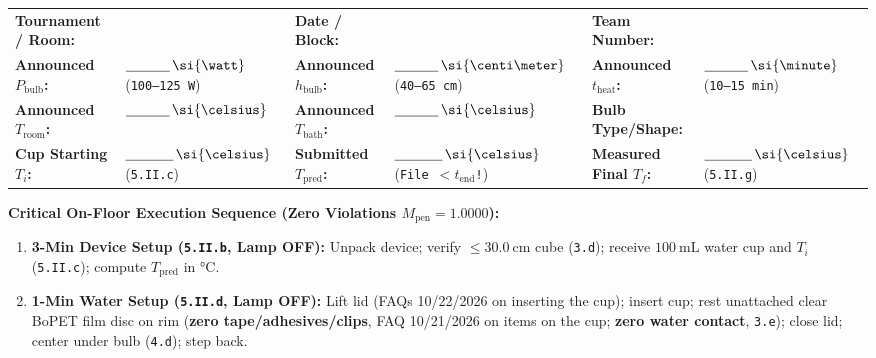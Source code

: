 \begin{devicebox}
\par\smallskip\noindent
{\scriptsize\setlength{\tabcolsep}{3.5pt}\renewcommand{\arraystretch}{1.20}
\begin{tabularx}{\linewidth}{@{}l X l X l X@{}}
\toprule
\textbf{Tournament / Room:} & \dotfill & \textbf{Date / Block:} & \dotfill & \textbf{Team Number:} & \dotfill \\
\textbf{Announced $P_{\mathrm{bulb}}$:} & $\underline{\hspace{1.1cm}}\,\si{\watt}$ (\texttt{100--125 W}) & \textbf{Announced $h_{\mathrm{bulb}}$:} & $\underline{\hspace{1.1cm}}\,\si{\centi\meter}$ (\texttt{40--65 cm}) & \textbf{Announced $t_{\mathrm{heat}}$:} & $\underline{\hspace{1.1cm}}\,\si{\minute}$ (\texttt{10--15 min}) \\
\textbf{Announced $T_{\mathrm{room}}$:} & $\underline{\hspace{1.1cm}}\,\si{\celsius}$ & \textbf{Announced $T_{\mathrm{bath}}$:} & $\underline{\hspace{1.1cm}}\,\si{\celsius}$ & \textbf{Bulb Type/Shape:} & \dotfill \\
\textbf{Cup Starting $T_i$:} & $\mathbf{\underline{\hspace{1.2cm}}\,\si{\celsius}}$ (\texttt{5.II.c}) & \textbf{Submitted $T_{\mathrm{pred}}$:} & $\mathbf{\underline{\hspace{1.2cm}}\,\si{\celsius}}$ (\texttt{File $<t_{\mathrm{end}}$!}) & \textbf{Measured Final $T_f$:} & $\mathbf{\underline{\hspace{1.2cm}}\,\si{\celsius}}$ (\texttt{5.II.g}) \\
\bottomrule
\end{tabularx}}
\par\vspace{2pt}\noindent
{\scriptsize
\textbf{Critical On-Floor Execution Sequence (Zero Violations $M_{\mathrm{pen}} = 1.0000$):}
\begin{enumerate}
  \item \textbf{3-Min Device Setup (\texttt{5.II.b}, Lamp OFF):} Unpack device; verify $\le \SI{30.0}{\centi\meter}$ cube (\texttt{3.d}); receive $\SI{100}{\milli\liter}$ water cup and $T_i$ (\texttt{5.II.c}); compute $T_{\mathrm{pred}}$ in $\si{\celsius}$.
  \item \textbf{1-Min Water Setup (\texttt{5.II.d}, Lamp OFF):} Lift lid (FAQs 10/22/2026 on inserting the cup); insert cup; rest unattached clear BoPET film disc on rim (\textbf{zero tape/adhesives/clips}, FAQ 10/21/2026 on items on the cup; \textbf{zero water contact}, \texttt{3.e}); close lid; center under bulb (\texttt{4.d}); step back.

\end{enumerate}}
\end{devicebox}
